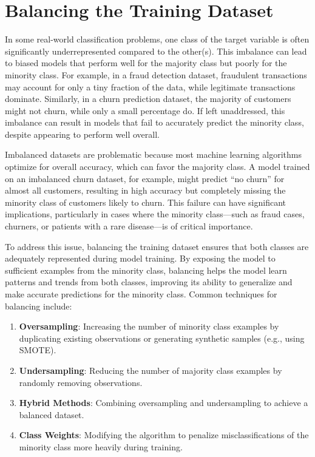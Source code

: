 \documentclass[
]{book}
\providecommand{\tightlist}{%
  \setlength{\itemsep}{0pt}\setlength{\parskip}{0pt}}
\theoremstyle{definition}
\theoremstyle{definition}
\theoremstyle{definition}
\theoremstyle{definition}
\theoremstyle{remark}
\begin{document}
\section{Balancing the Training Dataset}\label{balancing-the-training-dataset}

In some real-world classification problems, one class of the target variable is often significantly underrepresented compared to the other(s). This imbalance can lead to biased models that perform well for the majority class but poorly for the minority class. For example, in a fraud detection dataset, fraudulent transactions may account for only a tiny fraction of the data, while legitimate transactions dominate. Similarly, in a churn prediction dataset, the majority of customers might not churn, while only a small percentage do. If left unaddressed, this imbalance can result in models that fail to accurately predict the minority class, despite appearing to perform well overall.

Imbalanced datasets are problematic because most machine learning algorithms optimize for overall accuracy, which can favor the majority class. A model trained on an imbalanced churn dataset, for example, might predict ``no churn'' for almost all customers, resulting in high accuracy but completely missing the minority class of customers likely to churn. This failure can have significant implications, particularly in cases where the minority class---such as fraud cases, churners, or patients with a rare disease---is of critical importance.

To address this issue, balancing the training dataset ensures that both classes are adequately represented during model training. By exposing the model to sufficient examples from the minority class, balancing helps the model learn patterns and trends from both classes, improving its ability to generalize and make accurate predictions for the minority class. Common techniques for balancing include:

\begin{enumerate}
\def\labelenumi{\arabic{enumi}.}
\tightlist
\item
  \textbf{Oversampling}: Increasing the number of minority class examples by duplicating existing observations or generating synthetic samples (e.g., using SMOTE).\\
\item
  \textbf{Undersampling}: Reducing the number of majority class examples by randomly removing observations.\\
\item
  \textbf{Hybrid Methods}: Combining oversampling and undersampling to achieve a balanced dataset.\\
\item
  \textbf{Class Weights}: Modifying the algorithm to penalize misclassifications of the minority class more heavily during training.
\end{enumerate}
\end{document}
